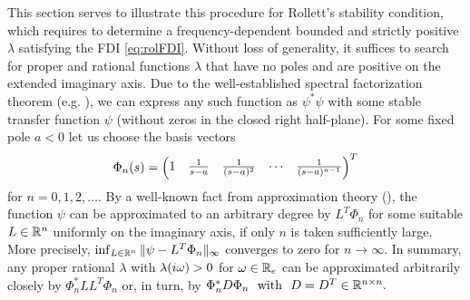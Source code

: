This section serves to illustrate this procedure for Rollett's stability condition, 
which requires to determine a frequency-dependent bounded and strictly positive 
$\lambda$ satisfying the FDI \eqref{eq:rolFDI}. Without loss of generality, it 
suffices to search for proper and rational functions $\lambda$ that have no poles 
and are positive on the extended imaginary axis. Due to the well-established spectral 
factorization theorem (e.g. \cite{francis}), we can express any such function as 
$\psi^*\psi$ with some stable transfer function $\psi$ (without zeros in the closed 
right half-plane). For some fixed pole $a<0$ let us choose the basis vectors
\begin{equation*}
\Phi_n(s) = \begin{pmatrix}1 &\frac{1}{s-a} &\frac{1}{(s-a)^2} &\cdots &\frac{1}{(s-a)^{n-1}}\end{pmatrix}^T
\end{equation*}
for $n=0,1,2,\ldots$. By a well-known fact from approximation theory (\cite{pinkus}), 
the function $\psi$ can be approximated to an arbitrary degree by $L^T\Phi_n$ for some 
suitable $L\in\mathbb{R}^n$ uniformly on the imaginary axis, if only $n$ is taken sufficiently 
large. More precisely, $\inf_{L\in\mathbb{R}^n}\|\psi-L^T\Phi_n\|_\infty$ converges to zero for 
$n\to\infty$. In summary, any proper rational $\lambda$ with $\lambda(i\omega)>0$ for 
$\omega\in\mathbb{R}_e$ can be approximated arbitrarily closely by $\Phi_n^*LL^T\Phi_n$ or, 
in turn, by $\Phi_n^*D\Phi_n\text{\ \ with\ \ }D=D^T\in\mathbb{R}^{n\times n}.$

